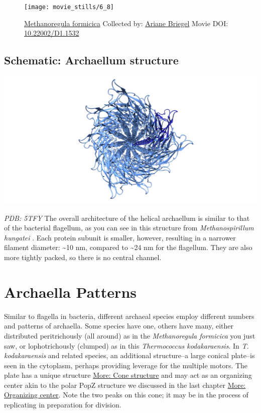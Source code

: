 \documentclass[]{tufte-book}
\begin{document}
\begin{figure}
\texttt{[image: movie\_stills/6\_8]} \caption[\protect\hyperlink{tree}{Methanoregula formicica} Collected
by: \protect\hyperlink{ariane_briegel}{Ariane Briegel} Movie DOI:
\href{https://doi.org/10.22002/D1.1532}{10.22002/D1.1532}]{\protect\hyperlink{tree}{Methanoregula formicica} Collected
by: \protect\hyperlink{ariane_briegel}{Ariane Briegel} Movie DOI:
\href{https://doi.org/10.22002/D1.1532}{10.22002/D1.1532}}\label{fig:6-8}
\end{figure}

\hypertarget{Archaellum_structure}{\subsection*{Schematic: Archaellum
structure}\label{Archaellum_structure}}

\includegraphics{img/schematics/6_8_1}

\emph{PDB: 5TFY} The overall architecture of the helical archaellum is
similar to that of the bacterial flagellum, as you can see in this
structure from \emph{Methanospirillum hungatei} \citep{poweleit2016}.
Each protein subunit is smaller, however, resulting in a narrower
filament diameter: \textasciitilde{}10 nm, compared to
\textasciitilde{}24 nm for the flagellum. They are also more tightly
packed, so there is no central channel.

\section{Archaella Patterns}\label{archaella-patterns}

Similar to flagella in bacteria, different archaeal species employ
different numbers and patterns of archaella. Some species have one,
others have many, either distributed peritrichously (all around) as in
the \emph{Methanoregula formicica} you just saw, or lophotrichously
(clumped) as in this \emph{Thermococcus kodakaraensis}. In \emph{T.
kodakaraensis} and related species, an additional structure--a large
conical plate--is seen in the cytoplasm, perhaps providing leverage for
the multiple motors. The plate has a unique structure
\protect\hyperlink{Cone_structure}{More: Cone structure} and may act as
an organizing center akin to the polar PopZ structure we discussed in
the last chapter \protect\hyperlink{Organizing_center}{More: Organizing
center}. Note the two peaks on this cone; it may be in the process of
replicating in preparation for division.
\end{document}
